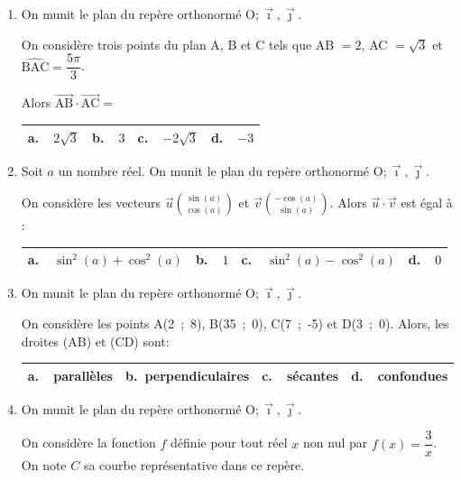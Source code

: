\documentclass[10pt]{article}
\providecommand{\vect}[1]{\overrightarrow{#1}}
\providecommand{\Oij}{\(\mathrm{O};\vec{\imath},\vec{\jmath}\)}
\begin{document}
\begin{enumerate}
\item On munit le plan du repère orthonormé \Oij.

On considère trois points du plan A, B et C tels que AB $= 2$, AC $= \sqrt{3}$ et $\widehat{\text{BAC}} = \dfrac{5\pi}{3}$.

Alors $\vect{\text{AB}} \cdot \vect{\text{AC}} = $

\begin{center}
\begin{tabularx}{\linewidth}{|*{4}{X|}}\hline
\textbf{a.~~}$2\sqrt{3}$ &\textbf{b.~~}$3$&\textbf{c.~~}$- 2\sqrt{3}$  &\textbf{d.~~}$ - 3$\\ \hline
\end{tabularx}
\end{center}

\item Soit $a$ un nombre réel. On munit le plan du repère orthonormé \Oij.

On considère les vecteurs $\vect{u}\binom{\sin (a)}{\cos (a)}$ et $\vect{v}\binom{-\cos (a)}{\sin (a)}$. Alors $\vect{u} \cdot \vect{v}$ est égal à :

\begin{center}
\begin{tabularx}{\linewidth}{|*{4}{X|}}\hline
\textbf{a.~~}$\sin^2 (a)+\cos^2 (a)$ &\textbf{b.~~}$1$&\textbf{c.~~}$\sin^2 (a)-\cos^2 (a)$  &\textbf{d.~~}$0$\\ \hline
\end{tabularx}
\end{center}

\item On munit le plan du repère orthonormé \Oij.

On considère les points A(2~;~8), B(35~;~0), C(7~;~-5) et D(3~;~0). Alors, les droites (AB) et (CD) sont:

\begin{center}
\begin{tabularx}{\linewidth}{|*{4}{X|}}\hline
\textbf{a.~~}parallèles&\textbf{b.~}perpendiculaires&\textbf{c.~~}sécantes&\textbf{d.~~}confondues\\ \hline
\end{tabularx}
\end{center}

\item On munit le plan du repère orthonormé \Oij.

On considère la fonction $f$ définie pour tout réel $x$ non nul par $f(x) = \dfrac{3}{x}$. On note $C$ sa courbe représentative dans ce repère. 


\end{enumerate}
\end{document}
